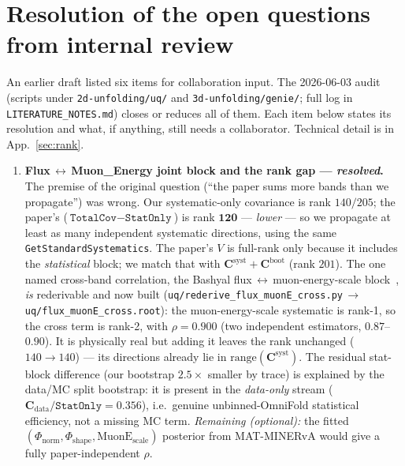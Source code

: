 \section{Resolution of the open questions from internal review}
\label{sec:openquestions}
\label{app:openq}

An earlier draft listed six items for collaboration input. The 2026-06-03 audit
(scripts under \texttt{2d-unfolding/uq/} and \texttt{3d-unfolding/genie/}; full
log in \texttt{LITERATURE\_NOTES.md}) closes or reduces all of them. Each item
below states its resolution and what, if anything, still needs a collaborator.
Technical detail is in App.~\ref{sec:rank}.

\begin{enumerate}
  \item \textbf{Flux\,$\leftrightarrow$\,Muon\_Energy joint block and the rank
        gap --- \emph{resolved}.} The premise of the original question (``the
        paper sums more bands than we propagate'') was wrong. Our systematic-only
        covariance is rank $140/205$; the paper's
        ($\texttt{TotalCov}-\texttt{StatOnly}$) is rank $\mathbf{120}$ ---
        \emph{lower} --- so we propagate at least as many independent systematic
        directions, using the same \texttt{GetStandardSystematics}. The paper's
        $V$ is full-rank only because it includes the \emph{statistical} block; we
        match that with $\mathbf{C}^{\mathrm{syst}}+\mathbf{C}^{\mathrm{boot}}$
        (rank $201$). The one named cross-band correlation, the Bashyal
        flux\,$\leftrightarrow$\,muon-energy-scale block~\cite{Bashyal:2021tqu},
        \emph{is} rederivable and now built
        (\texttt{uq/rederive\_flux\_muonE\_cross.py}\,$\to$\,\texttt{uq/flux\_muonE\_cross.root}):
        the muon-energy-scale systematic is rank-1, so the cross term is rank-2,
        with $\rho=0.900$ (two independent estimators, $0.87$--$0.90$). It is
        physically real but adding it leaves the rank unchanged ($140\to140$) ---
        its directions already lie in $\mathrm{range}(\mathbf{C}^{\mathrm{syst}})$.
        The residual stat-block difference (our bootstrap $2.5\times$ smaller by
        trace) is explained by the data/MC split bootstrap: it is present in the
        \emph{data-only} stream ($\mathbf{C}_{\mathrm{data}}/\texttt{StatOnly}=0.356$),
        i.e.\ genuine unbinned-OmniFold statistical efficiency, not a missing MC
        term. \emph{Remaining (optional):} the fitted
        $(\Phi_{\mathrm{norm}},\Phi_{\mathrm{shape}},\mathrm{MuonE}_{\mathrm{scale}})$
        posterior from MAT-MINERvA would give a fully paper-independent $\rho$.


\end{enumerate}
